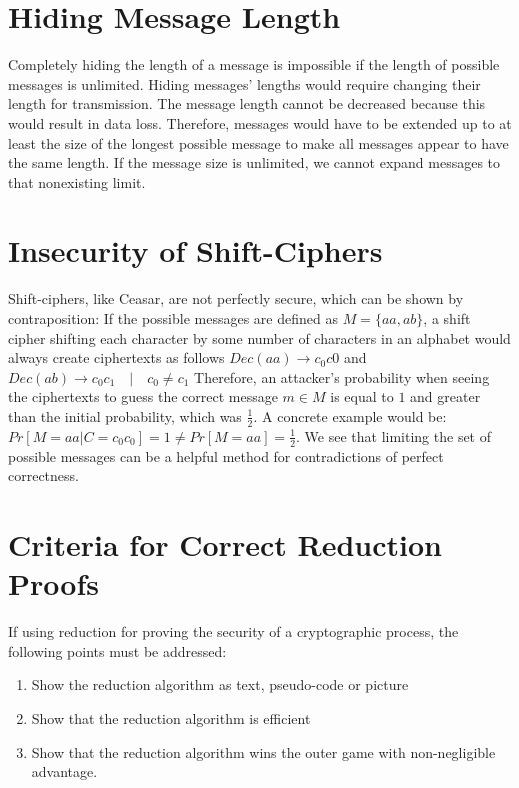 \section{Hiding Message Length}

Completely hiding the length of a message is impossible if the length of possible messages is unlimited. Hiding messages' lengths would require changing their length for transmission. The message length cannot be decreased because this would result in data loss. Therefore, messages would have to be extended up to at least the size of the longest possible message to make all messages appear to have the same length. If the message size is unlimited, we cannot expand messages to that nonexisting limit.

\section{Insecurity of Shift-Ciphers}

Shift-ciphers, like Ceasar, are not perfectly secure, which can be shown by contraposition: If the possible messages are defined as $M=\{aa, ab\}$, a shift cipher shifting each character by some number of characters in an alphabet would always create ciphertexts as follows $Dec(aa) \rightarrow c_{0}c{0}$ and $Dec(ab) \rightarrow c_{0}c_{1} \quad|\quad c_{0} \neq c_{1}$ Therefore, an attacker's probability when seeing the ciphertexts to guess the correct message $m \in M$ is equal to $1$ and greater than the initial probability, which was $\frac{1}{2}$. A concrete example would be: $Pr[M=aa | C=c_{0}c_{0}] = 1 \neq Pr[M=aa] = \frac{1}{2}$. We see that limiting the set of possible messages can be a helpful method for contradictions of perfect correctness.

\section{Criteria for Correct Reduction Proofs}

If using reduction for proving the security of a cryptographic process, the following points must be addressed:

\begin{enumerate}
    \item Show the reduction algorithm as text, pseudo-code or picture
    \item Show that the reduction algorithm is efficient
    \item Show that the reduction algorithm wins the outer game with non-negligible advantage.
\end{enumerate}